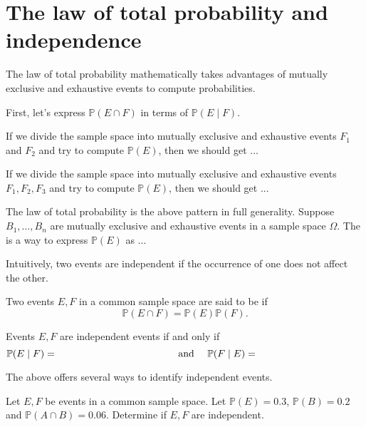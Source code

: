 \documentclass[../main.tex]{subfiles}
\begin{document}
 \section{The law of total probability and independence}

The law of total probability mathematically takes advantages of mutually exclusive and exhaustive events to compute probabilities.

First, let's express \(\mathbb{P}(E \cap F)\) in terms of \(\mathbb{P}(E \mid F)\).

If we divide the sample space into mutually exclusive and exhaustive events \(F_{1}\) and \(F_{2}\) and try to compute \(\mathbb{P}(E)\), then we should get ...


If we divide the sample space into mutually exclusive and exhaustive events \(F_{1}, F_{2}, F_{3}\) and try to compute \(\mathbb{P}(E)\), then we should get ...

\faStar{} The law of total probability is the above pattern in full generality. Suppose \(B_{1}, \ldots, B_{n}\) are mutually exclusive and exhaustive events in a sample space \(\Omega\). The  is a way to express \(\mathbb{P}(E)\) as ...
\clearpage

Intuitively, two events are independent if the occurrence of one does not affect the other.

\begin{definition}
  Two events \(E,F\) in a common sample space are said to be  if 
  \begin{equation} \label{eq:probability-independence}
    \mathbb{P}(E \cap F) = \mathbb{P}(E) \mathbb{P}(F). 
  \end{equation}
\end{definition}

\faStar{} Events \(E,F\) are independent events if and only if
\begin{equation} \label{eq:probability-conditional-of-independent}
  \mathbb{P}(E \mid F) = \hspace{1.5in}
  \quad\text{ and }\quad
  \mathbb{P}(F \mid E) = \hspace{1.5in}
\end{equation}

The above offers several ways to identify independent events.

\begin{example}
  Let \(E, F\) be events in a common sample space. Let \(\mathbb{P}(E) = 0.3\), \(\mathbb{P}(B) = 0.2\) and \(\mathbb{P}(A \cap B) = 0.06\). Determine if \(E,F\) are independent.
\end{example}
\end{document}
